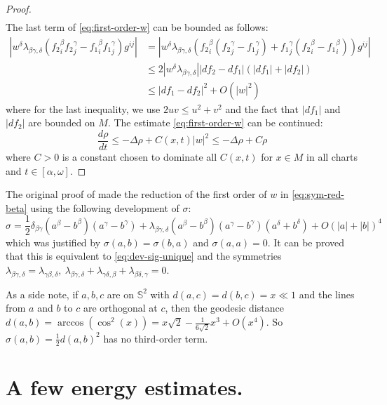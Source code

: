 \begin{proof}
\begin{align}
\end{align}
The last term of \eqref{eq:first-order-w} can be bounded as follows:
\begin{align*}
    \left | w^\delta \lambda_{\beta\gamma,\delta}\left({f_2}^\beta_i {f_2}^\gamma_j -
{f_1}^\beta_i {f_1}^\gamma_j\right) g^{ij} \right| &=   \left | w^\delta \lambda_{\beta\gamma,\delta}\left({f_2}^\beta_i ({f_2}^\gamma_j - {f_1}^\gamma_j) + {f_1}^\gamma_j({f_2}^\beta_i -
{f_1}^\beta_i) \right) g^{ij} \right| \\
	       &\leq 2 |w^\delta \lambda_{\beta\gamma,\delta}| |df_2 -df_1| (|df_1| + |df_2|)\\
	       &\leq |df_1 - df_2|^2 + O(|w|^2)
\end{align*}
where for the last inequality, we use \(2uv \leq u^2 + v^2\) and the fact that \(|df_1|\) and \(|df_2|\) are bounded on \(M\). The estimate \eqref{eq:first-order-w} can be
continued:
\[
 \frac{d \rho}{d t}\leq -\Delta\rho + C(x,t) |w|^2 \leq -\Delta \rho + C \rho
\]
where \(C >0\) is a constant chosen to dominate all \(C(x,t)\) for \(x\in M\) in all
charts and \(t\in [\alpha,\omega]\).
\end{proof}

\begin{remark}
\label{rem:hamilton-alg-rig}
The original proof of \cite{hamilton_harmonic_1975}
made the reduction of the first order of \(w\) in \eqref{eq:sym-red-beta} using
the following development of \(\sigma\):
\[
 \sigma = \frac{1}{2}\delta_{\beta\gamma} (a^\beta - b^\beta)(a^\gamma - b^\gamma) +
\lambda_{\beta\gamma,\delta} (a^\beta - b^\beta)(a^\gamma -b^\gamma)(a^\delta + b^\delta) + O(|a|+|b|)^4
\]
which was justified by \(\sigma(a,b) = \sigma(b,a)\) and \(\sigma(a,a)=0\). It can be proved that this is equivalent to \eqref{eq:dev-sig-unique} and the symmetries \(\lambda_{\beta\gamma,\delta} =
\lambda_{\gamma\beta,\delta},\ \lambda_{\beta\gamma,\delta}
+\lambda_{\gamma\delta,\beta} + \lambda_{\beta\delta,\gamma}= 0\).

As a side note, if \(a,b,c\) are on \(\mathbb{S}^2\) with \(d(a,c) = d(b,c) = x \ll 1\)
and the lines from \(a\) and \(b\) to \(c\) are orthogonal at \(c\), then the
geodesic distance \(d(a,b) = \arccos(\cos^2(x)) = x\sqrt{2} - \frac{1}{6\sqrt{2}}x^3 +
O(x^4)\). So \(\sigma(a,b) = \frac{1}{2}d(a,b)^2\) has no third-order term.
\end{remark}

\section{A few energy estimates.}
\label{sec:orgddb356b}
